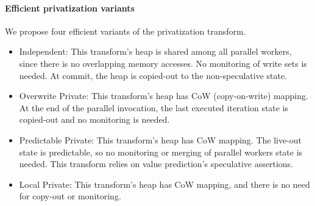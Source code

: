 \paragraph{Efficient privatization variants}
\label{novel_transf}
We propose four efficient variants of the privatization transform.
\begin{itemize}
%
\item Independent: This transform's heap is shared
  among all parallel workers, since there is no overlapping memory
  accesses.
  No monitoring of write sets is needed. At commit, the heap is copied-out
  to the non-speculative state.
%


\item Overwrite Private: This transform's heap has
  CoW (copy-on-write) mapping. At the end of the parallel
  invocation, the last executed iteration
  state is copied-out and no monitoring is needed.

%

\item Predictable Private: This transform's heap
  has CoW mapping. The live-out state is predictable, so no monitoring
  or merging of parallel workers state is needed. This transform
  relies on value prediction's speculative assertions.

\item Local Private: This transform's heap has
  CoW mapping, and there is no need for copy-out or monitoring.

\end{itemize}

%

